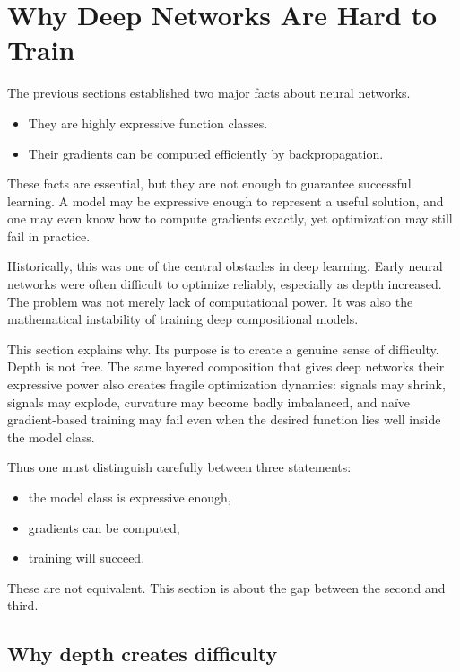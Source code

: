 \section{Why Deep Networks Are Hard to Train}

The previous sections established two major facts about neural networks.

\begin{itemize}
    \item They are highly expressive function classes.
    \item Their gradients can be computed efficiently by backpropagation.
\end{itemize}

These facts are essential, but they are not enough to guarantee successful learning.
A model may be expressive enough to represent a useful solution, and one may even know how to compute gradients exactly, yet optimization may still fail in practice.

\medskip

Historically, this was one of the central obstacles in deep learning.
Early neural networks were often difficult to optimize reliably, especially as depth increased.
The problem was not merely lack of computational power.
It was also the mathematical instability of training deep compositional models.

\medskip

This section explains why.
Its purpose is to create a genuine sense of difficulty.
Depth is not free.
The same layered composition that gives deep networks their expressive power also creates fragile optimization dynamics:
signals may shrink,
signals may explode,
curvature may become badly imbalanced,
and naïve gradient-based training may fail even when the desired function lies well inside the model class.

\medskip

Thus one must distinguish carefully between three statements:

\begin{itemize}
    \item the model class is expressive enough,
    \item gradients can be computed,
    \item training will succeed.
\end{itemize}

These are not equivalent.
This section is about the gap between the second and third.

\subsection*{Why depth creates difficulty}

